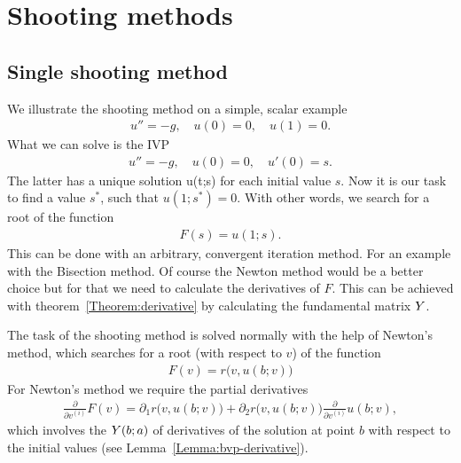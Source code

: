 \section{Shooting methods}
\subsection{Single shooting method}

\begin{example}
  We illustrate the shooting method on a simple, scalar example
  \begin{gather*}
    u'' = -g, \quad u(0) = 0, \quad u(1) = 0.
  \end{gather*}
	What we can solve is the IVP
  \begin{gather*}
    u'' = -g, \quad u(0) = 0, \quad u'(0) = s.
  \end{gather*}
	The latter has a unique solution u(t;s) for each initial value
  $s$. Now it is our task to find a value $s^*$, such that
  $u(1;s^*) = 0$. With other words, we search for a root of the function
  \begin{gather*}  
    F(s) = u(1;s).
  \end{gather*}
  This can be done with an arbitrary, convergent iteration method.
  For an example with the Bisection method.  Of course the Newton
  method would be a better choice but for that we need to calculate
  the derivatives of $F$.  This can be achieved with
  theorem~\ref{Theorem:derivative} by calculating the
  fundamental matrix $Y$.
\end{example}



\begin{remark}
  The task of the shooting method is solved normally with the help of
  Newton's method, which searches for a root (with respect to $v$) of
  the function
  \begin{gather}
    \label{eq:rwa:11}
    F(v) = r\bigl(v, u(b;v)\bigr)
  \end{gather}
	For Newton's method we require the partial derivatives
  \begin{gather*}
    \frac\partial{\partial v^{(i)}} F(v) =
    \partial_1 r\bigr(v,u(b;v)\bigr)
    + \partial_2r\bigr(v,u(b;v)\bigr) \frac\partial{\partial v^{(i)}} u(b;v),
  \end{gather*}
  which involves the  $\fundamental(b;a)$
  of derivatives of the solution at point $b$ with respect to the
  initial values (see Lemma~\ref{Lemma:bvp-derivative}).
\end{remark}

